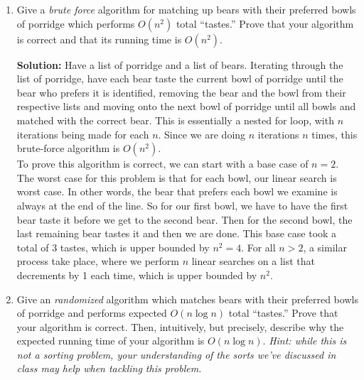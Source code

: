 \documentclass[10pt]{article}
\begin{document}
\begin{enumerate}
    \item Give a {\em brute force} algorithm for matching up bears with their preferred bowls of porridge which performs $O(n^2)$ total ``tastes.'' Prove that your algorithm is correct and that its running time is $O(n^2)$.
    
    \textbf{Solution: }
    Have a list of porridge and a list of bears. Iterating through the list of porridge, have each bear taste the current bowl of porridge until the bear who prefers it is identified, removing the bear and the bowl from their respective lists and moving onto the next bowl of porridge until all bowls and matched with the correct bear. This is essentially a nested for loop, with $n$ iterations being made for each $n$. Since we are doing $n$ iterations $n$ times, this brute-force algorithm is $O(n^2)$.\\
    To prove this algorithm is correct, we can start with a base case of $n = 2$. The worst case for this problem is that for each bowl, our linear search is worst case. In other words, the bear that prefers each bowl we examine is always at the end of the line. So for our first bowl, we have to have the first bear taste it before we get to the second bear. Then for the second bowl, the last remaining bear tastes it and then we are done. This base case took a total of 3 tastes, which is upper bounded by $n^2 = 4$. For all $n > 2$, a similar process take place, where we perform $n$ linear searches on a list that decrements by 1 each time, which is upper bounded by $n^2$.
    
    \item Give an {\em randomized} algorithm which matches bears with their preferred bowls of porridge and performs expected $O(n \log n)$ total ``tastes.'' Prove that your algorithm is correct. Then, intuitively, but precisely, describe why the expected running time of your algorithm is $O(n \log n)$. {\em Hint: while this is not a sorting problem, your understanding of the sorts we've discussed in class may help when tackling this problem.}
    

\end{enumerate}
\end{document}
